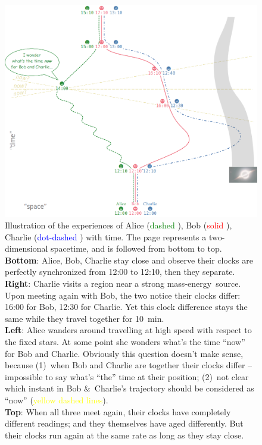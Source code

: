 \documentclass[a4paper,12pt,%
onecolumn,oneside,titlepage,%
british%
]{memoir}
\newcommand*{\amp}{\&}
\renewcommand*{\|}[1][]{\nonscript\:#1\vert\nonscript\:\mathopen{}}
\newcommand*{\masse}{mass-energy}
\begin{document}
\begin{figure}[p]
  \includegraphics[width=\linewidth]{ABC_spacetime.png}
  \caption{Illustration of the experiences of Alice (\textcolor{green}{dashed }), Bob (\textcolor{red}{solid }), Charlie (\textcolor{blue}{dot-dashed }) with time. The page represents a two-dimensional spacetime, and is followed from bottom to top.
\\\textbf{Bottom}: Alice, Bob, Charlie stay close and observe their clocks are perfectly synchronized from 12:00 to 12:10, then they separate.
\\\textbf{Right}: Charlie visits a region near a strong \masse\ source. Upon meeting again with Bob, the two notice their clocks differ: 16:00 for Bob, 12:30 for Charlie. Yet this clock difference stays the same while they travel together for \qty{10}{min}.
\\\textbf{Left}: Alice wanders around travelling at high speed with respect to the fixed stars. At some point she wonders what's the time \enquote{now} for Bob and Charlie. Obviously this question doesn't make sense, because
(1)~when Bob and Charlie are together their clocks differ -- impossible to say what's \enquote{the} time at their position; (2)~not clear which instant in Bob \amp\ Charlie's trajectory should be considered as \enquote{now} (\textcolor{yellow}{yellow dashed lines}).
\\\textbf{Top}: When all three meet again, their clocks have completely different readings; and they themselves have aged differently. But their clocks run again at the same rate as long as they stay close.}  \label{fig:ABC_spacetime}
\end{figure}
\clearpage
\end{document}
